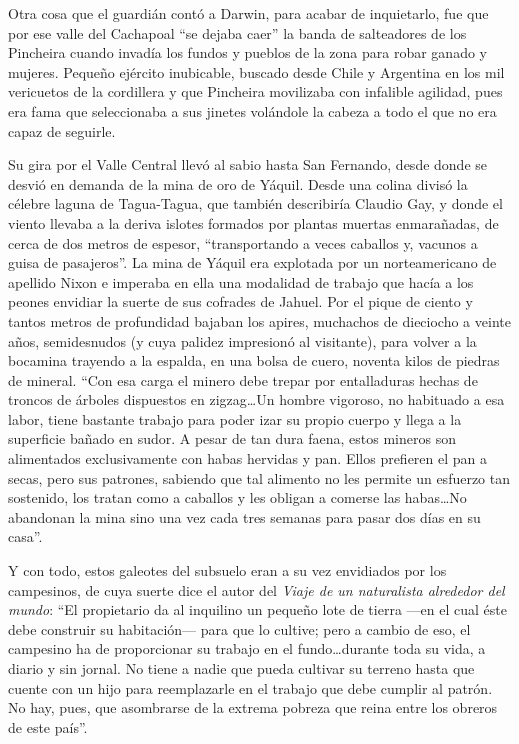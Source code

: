 \documentclass[10pt,twoside,openright]{memoir}
\begin{document}
Otra cosa que el guardián contó a Darwin, para acabar de inquietarlo,
fue que por ese valle del Cachapoal ``se dejaba caer'' la banda de
salteadores de los Pincheira cuando invadía los fundos y pueblos de la
zona para robar ganado y mujeres. Pequeño ejército inubicable, buscado
desde Chile y Argentina en los mil vericuetos de la cordillera y que
Pincheira movilizaba con infalible agilidad, pues era fama que
seleccionaba a sus jinetes volándole la cabeza a todo el que no era
capaz de seguirle.

Su gira por el Valle Central llevó al sabio hasta San Fernando, desde
donde se desvió en demanda de la mina de oro de Yáquil. Desde una colina
divisó la célebre laguna de Tagua-Tagua, que también describiría Claudio
Gay, y donde el viento llevaba a la deriva islotes formados por plantas
muertas enmarañadas, de cerca de dos metros de espesor, ``transportando a
veces caballos y, vacunos a guisa de pasajeros''. La mina de Yáquil era
explotada por un norteamericano de apellido Nixon e imperaba en ella una
modalidad de trabajo que hacía a los peones envidiar la suerte de sus
cofrades de Jahuel. Por el pique de ciento y tantos metros de
profundidad bajaban los apires, muchachos de dieciocho a veinte años,
semidesnudos (y cuya palidez impresionó al
visitante), para volver a la
bocamina trayendo a la espalda, en una bolsa de cuero, noventa kilos de
piedras de mineral. ``Con esa carga el minero debe trepar por
entalladuras hechas de troncos de árboles dispuestos en zigzag\ldots Un
hombre vigoroso, no habituado a esa labor, tiene bastante trabajo para
poder izar su propio cuerpo y llega a la superficie bañado en sudor. A
pesar de tan dura faena, estos mineros son alimentados exclusivamente
con habas hervidas y pan. Ellos prefieren el pan a secas, pero sus
patrones, sabiendo que tal alimento no les permite un esfuerzo tan
sostenido, los tratan como a caballos y les obligan a comerse las
habas\ldots No abandonan la mina sino
una vez cada tres semanas para pasar dos días en su casa''.

Y con todo, estos galeotes del subsuelo eran a su vez envidiados por los
campesinos, de cuya suerte dice el
autor del \emph{Viaje de un naturalista alrededor del mundo}: ``El
propietario da al inquilino un pequeño lote de tierra ---en el cual éste
debe construir su habitación--- para que lo cultive; pero a cambio de
eso, el campesino ha de proporcionar su trabajo en el fundo\ldots durante
toda su vida, a diario y sin jornal. No tiene a nadie que pueda cultivar
su terreno hasta que cuente con un hijo para reemplazarle en el trabajo
que debe cumplir al patrón. No hay, pues, que asombrarse de la extrema
pobreza que reina entre los obreros de este país''.
\end{document}
